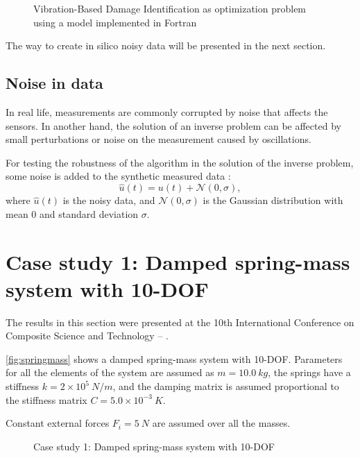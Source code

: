 \begin{figure}[H]
    \caption{Vibration-Based Damage Identification as optimization problem using a model implemented in Fortran}
    \label{fig:inversefortran}
    \centering
    \vspace{1em}
\end{figure}

The way to create in silico noisy data will be presented in the next section.

\subsection{Noise in data}

In real life, measurements are commonly corrupted by noise that affects the sensors. In another hand, the solution of an inverse problem can be affected by small perturbations or noise on the measurement caused by oscillations.

For testing the robustness of the algorithm in the solution of the inverse problem, some noise is added to the synthetic measured data \cite{nichols2016modeling}:
%
\begin{equation}
\label{eq:noise}
{\hat{u}}(t) = {u}(t) + \mathcal{N}(0,\sigma),
\end{equation}
%
where ${\hat{u}}(t)$ is the noisy data, and  $\mathcal{N}(0,\sigma)$ is the Gaussian distribution with mean $0$ and standard deviation $\sigma$.

\section{Case study 1: Damped spring-mass system with 10-DOF}
\label{sec:springmass}

The results in this section were presented at the 10th International Conference on Composite Science and Technology -- \cite{HernandezTorres2015b}.

\autoref{fig:springmass} shows a damped spring-mass system with 10-DOF. Parameters for all the elements of the system are assumed as $m = 10.0~kg$, the springs have a stiffness $k= 2\times 10^{5}~N/m$, and the damping matrix is assumed proportional to the stiffness matrix $C = 5.0 \times 10^{-3}~K$.

Constant external forces $F_i = 5~N$ are assumed over all the masses.

\begin{figure}[H]
\centering
\caption{Case study 1: Damped spring-mass system with 10-DOF}
\label{fig:springmass}
\end{figure}


